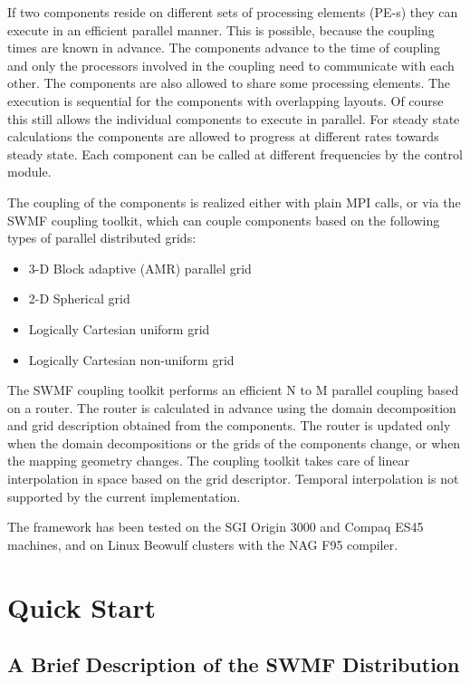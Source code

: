 If two components reside on different sets of processing elements
(PE-s) they can execute in an efficient parallel manner.
This is possible, because the coupling times are
known in advance.  The components advance to the time of coupling and
only the processors involved in the coupling need to communicate with
each other. The components are also allowed to share some processing elements.
The execution is sequential for the components with overlapping layouts.
Of course this still allows the individual components to execute in parallel.
For steady state calculations the components are allowed to progress
at different rates towards steady state. Each component can be called
at different frequencies by the control module.

The coupling of the components is realized either with plain MPI
calls, or via the SWMF coupling toolkit, which can couple components
based on the following types of parallel distributed grids:
\begin{itemize}
\item 3-D Block adaptive (AMR) parallel grid
\item 2-D Spherical grid
\item Logically Cartesian uniform grid
\item Logically Cartesian non-uniform grid 
\end{itemize}
The SWMF coupling toolkit performs an efficient N to M parallel
coupling based on a router. The router is calculated in advance using
the domain decomposition and grid description obtained from the
components.  The router is updated only when the domain decompositions
or the grids of the components change, or when the mapping geometry
changes.  The coupling toolkit takes care of linear interpolation in
space based on the grid descriptor.  Temporal interpolation is not
supported by the current implementation.

The framework has been tested on the SGI Origin 3000 and Compaq ES45
machines, and on Linux Beowulf clusters with the NAG F95 compiler.


\chapter{Quick Start}

\section{A Brief Description of the SWMF Distribution}

